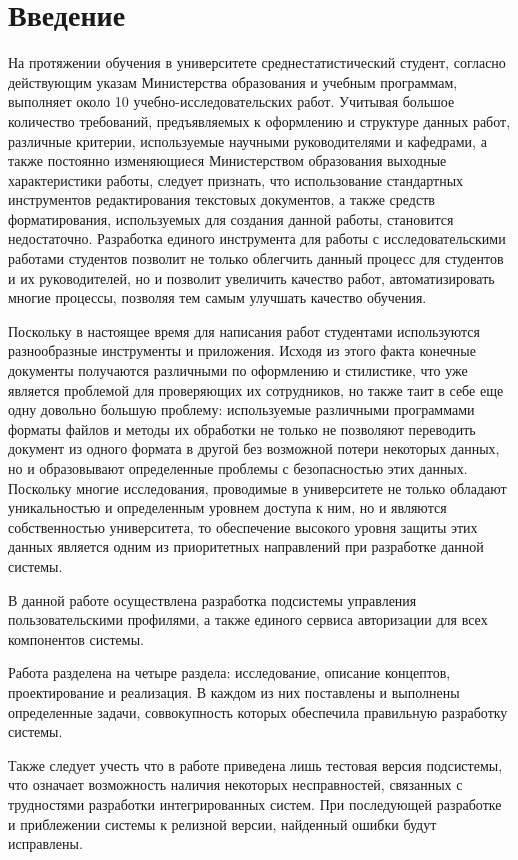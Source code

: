 \chapter*{Введение}
\label{sec:afterwords}

На протяжении обучения в университете среднестатистический студент, согласно действующим указам Министерства образования и учебным программам, выполняет около 10 учебно-исследовательских работ. Учитывая большое количество требований, предъявляемых к оформлению и структуре данных работ, различные критерии, используемые научными руководителями и кафедрами, а также постоянно изменяющиеся Министерством образования выходные характеристики работы, следует признать, что использование стандартных инструментов редактирования текстовых документов, а также средств форматирования, используемых для создания данной работы, становится недостаточно. Разработка единого инструмента для работы с исследовательскими работами студентов позволит не только облегчить данный процесс для студентов и их руководителей, но и позволит увеличить качество работ, автоматизировать многие процессы, позволяя тем самым улучшать качество обучения.

Поскольку в настоящее время для написания работ студентами используются разнообразные инструменты и приложения. Исходя из этого факта конечные документы получаются различными по оформлению и стилистике, что уже является проблемой для проверяющих их сотрудников, но также таит в себе еще одну довольно большую проблему: используемые различными программами форматы файлов и методы их обработки не только не позволяют переводить документ из одного формата в другой без возможной потери некоторых данных, но и образовывают определенные проблемы с безопасностью этих данных. Поскольку многие исследования, проводимые в университете не только обладают уникальностью и определенным уровнем доступа к ним, но и являются собственностью университета, то обеспечение высокого уровня защиты этих данных является одним из приоритетных направлений при разработке данной системы.

В данной работе осуществлена разработка подсистемы управления пользовательскими профилями, а также единого сервиса авторизации для всех компонентов системы.

Работа разделена на четыре раздела: исследование, описание концептов, проектирование и реализация. В каждом из них поставлены и выполнены определенные задачи, соввокупность которых обеспечила правильную разработку системы.

Также следует учесть что в работе приведена лишь тестовая версия подсистемы, что означает возможность наличия некоторых несправностей, связанных с трудностями разработки интегрированных систем. При последующей разработке и приблежении системы к релизной версии, найденный ошибки будут исправлены.
